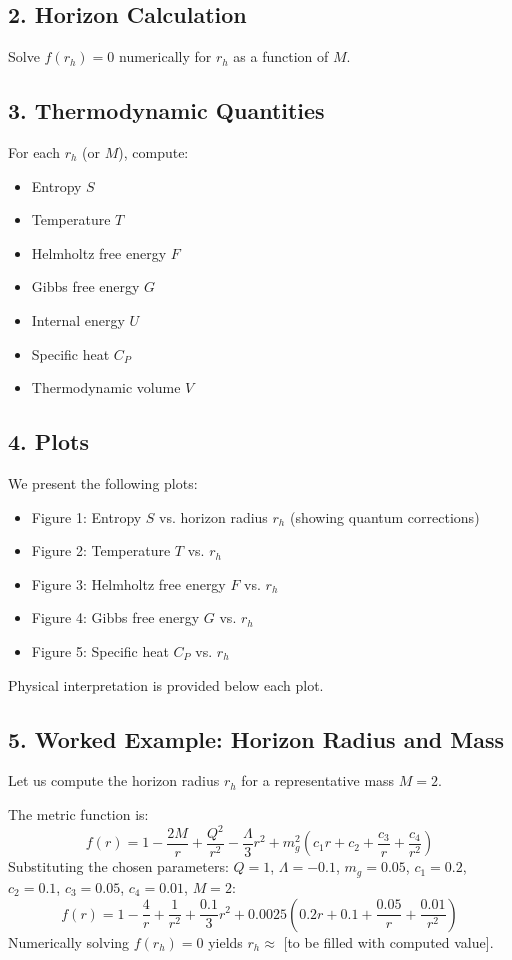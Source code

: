 \documentclass[12pt]{article}
\begin{document}
\subsection*{2. Horizon Calculation}
Solve $f(r_h) = 0$ numerically for $r_h$ as a function of $M$.

\subsection*{3. Thermodynamic Quantities}
For each $r_h$ (or $M$), compute:
\begin{itemize}
    \item Entropy $S$
    \item Temperature $T$
    \item Helmholtz free energy $F$
    \item Gibbs free energy $G$
    \item Internal energy $U$
    \item Specific heat $C_P$
    \item Thermodynamic volume $V$
\end{itemize}

\subsection*{4. Plots}
We present the following plots:
\begin{itemize}
    \item Figure 1: Entropy $S$ vs. horizon radius $r_h$ (showing quantum corrections)
    \item Figure 2: Temperature $T$ vs. $r_h$
    \item Figure 3: Helmholtz free energy $F$ vs. $r_h$
    \item Figure 4: Gibbs free energy $G$ vs. $r_h$
    \item Figure 5: Specific heat $C_P$ vs. $r_h$
\end{itemize}
Physical interpretation is provided below each plot.

\subsection*{5. Worked Example: Horizon Radius and Mass}
Let us compute the horizon radius $r_h$ for a representative mass $M = 2$.

The metric function is:
\begin{equation}
f(r) = 1 - \frac{2M}{r} + \frac{Q^2}{r^2} - \frac{\Lambda}{3} r^2 + m_g^2 (c_1 r + c_2 + \frac{c_3}{r} + \frac{c_4}{r^2})
\end{equation}
Substituting the chosen parameters:
$Q=1$, $\Lambda=-0.1$, $m_g=0.05$, $c_1=0.2$, $c_2=0.1$, $c_3=0.05$, $c_4=0.01$, $M=2$:
\begin{equation}
f(r) = 1 - \frac{4}{r} + \frac{1}{r^2} + \frac{0.1}{3} r^2 + 0.0025 (0.2 r + 0.1 + \frac{0.05}{r} + \frac{0.01}{r^2})
\end{equation}
Numerically solving $f(r_h) = 0$ yields $r_h \approx$ [to be filled with computed value].
\end{document}
